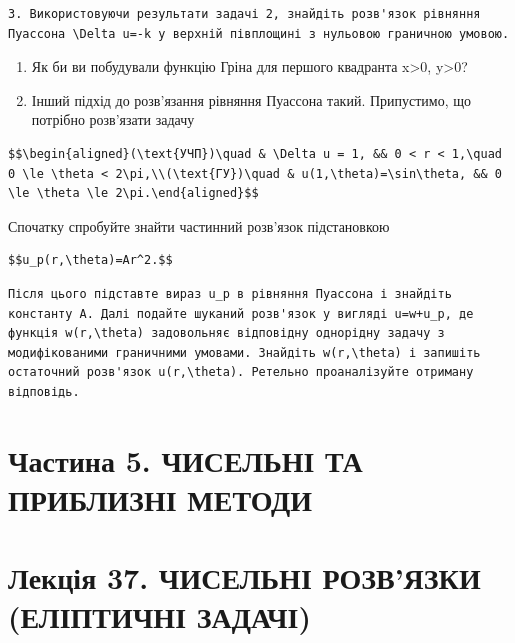 \documentclass[
  ukrainian,
]{article}
\begin{document}
\begin{verbatim}
3. Використовуючи результати задачі 2, знайдіть розв'язок рівняння Пуассона \Delta u=-k у верхній півплощині з нульовою граничною умовою.
\end{verbatim}

\begin{enumerate}
\def\labelenumi{\arabic{enumi}.}
\setcounter{enumi}{3}
\item
  Як би ви побудували функцію Гріна для першого квадранта
  x\textgreater0, y\textgreater0?
\item
  Інший підхід до розв'язання рівняння Пуассона такий. Припустимо, що
  потрібно розв'язати задачу
\end{enumerate}

\begin{verbatim}
$$\begin{aligned}(\text{УЧП})\quad & \Delta u = 1, && 0 < r < 1,\quad 0 \le \theta < 2\pi,\\(\text{ГУ})\quad & u(1,\theta)=\sin\theta, && 0 \le \theta \le 2\pi.\end{aligned}$$
\end{verbatim}

Спочатку спробуйте знайти частинний розв'язок підстановкою

\begin{verbatim}
$$u_p(r,\theta)=Ar^2.$$
\end{verbatim}

\begin{verbatim}
Після цього підставте вираз u_p в рівняння Пуассона і знайдіть константу A. Далі подайте шуканий розв'язок у вигляді u=w+u_p, де функція w(r,\theta) задовольняє відповідну однорідну задачу з модифікованими граничними умовами. Знайдіть w(r,\theta) і запишіть остаточний розв'язок u(r,\theta). Ретельно проаналізуйте отриману відповідь.
\end{verbatim}

\section{Частина 5. ЧИСЕЛЬНІ ТА ПРИБЛИЗНІ
МЕТОДИ}\label{ux447ux430ux441ux442ux438ux43dux430-5.-ux447ux438ux441ux435ux43bux44cux43dux456-ux442ux430-ux43fux440ux438ux431ux43bux438ux437ux43dux456-ux43cux435ux442ux43eux434ux438}

\section{Лекція 37. ЧИСЕЛЬНІ РОЗВ'ЯЗКИ (ЕЛІПТИЧНІ
ЗАДАЧІ)}\label{ux43bux435ux43aux446ux456ux44f-37.-ux447ux438ux441ux435ux43bux44cux43dux456-ux440ux43eux437ux432ux44fux437ux43aux438-ux435ux43bux456ux43fux442ux438ux447ux43dux456-ux437ux430ux434ux430ux447ux456}
\end{document}
